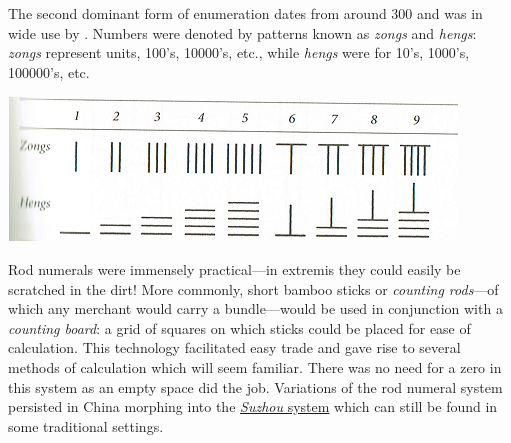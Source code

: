 The second dominant form of enumeration dates from around 300\BC{} and was in wide use by . Numbers were denoted by patterns known as \emph{zongs} and \emph{hengs}: \emph{zongs} represent units, 100's, 10000's, etc., while \emph{hengs} were for 10's, 1000's, 100000's, etc.
\begin{center}
  \includegraphics[angle=0.8]{ZongHeng-small.png}
\end{center}
Rod numerals were immensely practical---in extremis they could easily be scratched in the dirt! More commonly, short bamboo sticks or \emph{counting rods}---of which any merchant would carry a bundle---would be used in conjunction with a \emph{counting board}: a grid of squares on which sticks could be placed for ease of calculation. This technology facilitated easy trade and gave rise to several methods of calculation which will seem familiar. There was no need for a zero in this system as an empty space did the job. Variations of the rod numeral system persisted in China morphing into the \href{http://en.wikipedia.org/wiki/Suzhou_numerals}{\emph{Suzhou} system} which can still be found in some traditional settings.
\goodbreak



